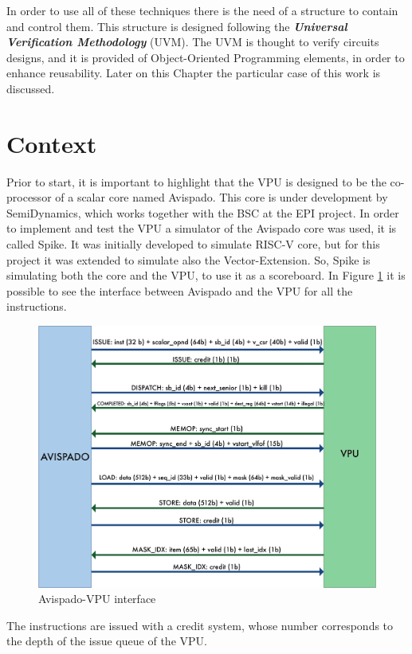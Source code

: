 In order to use all of these techniques there is the need of a structure to contain and control them.
This structure is designed following the \textbf{\emph{Universal Verification Methodology}} (UVM). The UVM is thought to verify circuits designs, and it is provided of Object-Oriented Programming elements, in order to enhance reusability. Later on this Chapter the particular case of this work is discussed.

\section{Context}
Prior to start, it is important to highlight that the VPU is designed to be the co-processor of a scalar core named Avispado. This core is under development by SemiDynamics, which works together with the BSC at the EPI project. In order to implement and test the VPU a simulator of the Avispado core was used, it is called Spike. It was initially developed to simulate RISC-V core, but for this project it was extended to simulate also the Vector-Extension. So, Spike is simulating both the core and the VPU, to use it as a scoreboard.
In Figure \ref{avi-vpu} it is possible to see the interface between Avispado and the VPU for all the instructions.

\begin{figure}[H]
    \centering
    \includegraphics[scale = 0.6]{Chapter_1/img/avi-vpu.png}
    \caption{Avispado-VPU interface}
    \label{avi-vpu}
\end{figure}


The instructions are issued with a credit system, whose number corresponds to the depth of the issue queue of the VPU.



